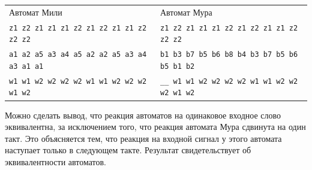 \documentclass[12pt, a4paper]{article}
\begin{document}
\noindent
\begin{small}
\begin{tabular}{ l | l }
  \normalsize{Автомат Мили} & \normalsize{Автомат Мура} \\
  \texttt{z1 z2 z1 z1 z1 z2 z1 z2 z1 z1 z2 z2 z2} & 
    \texttt{z1 z2 z1 z1 z1 z2 z1 z2 z1 z1 z2 z2 z2} \\
  \texttt{a1 a2 a5 a3 a4 a5 a2 a2 a5 a3 a4 a3 a1 a1} &
    \texttt{b1 b3 b7 b5 b6 b8 b4 b3 b7 b5 b6 b5 b1 b2} \\
  \texttt{w1 w1 w2 w2 w2 w2 w1 w1 w2 w2 w2 w1 w2} &
    \texttt{\_\_ w1 w1 w2 w2 w2 w2 w1 w1 w2 w2 w2 w1 w2}
\end{tabular}
\end{small}

Можно сделать вывод, что реакция автоматов на одинаковое входное слово
эквивалентна, за исключением того, что реакция автомата Мура сдвинута на один
такт. Это объясняется тем, что реакция на входной сигнал у этого автомата
наступает только в следующем такте. Результат свидетельствует об эквивалентности
автоматов.
\end{document}

